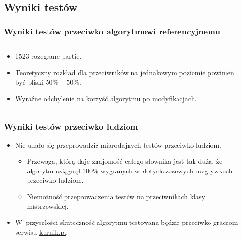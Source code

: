 \documentclass[10pt,a4paper]{beamer}
\begin{document}
\subsection{Wyniki testów}

\begin{frame}
	\frametitle{Wyniki testów przeciwko algorytmowi referencyjnemu}

	\begin{columns}
		\begin{column}{.45\textwidth}
			\begin{itemize}
				\item 1523 rozegrane partie.
				\item Teoretyczny rozkład dla przeciwników na jednakowym poziomie powinien być bliski $50\%-50\%$.
				\item Wyraźne odchylenie na korzyść algorytmu po modyfikacjach.
			\end{itemize}
		\end{column}
		\begin{column}{.55\textwidth}
		\end{column}
	\end{columns}
\end{frame}

\begin{frame}
	\frametitle{Wyniki testów przeciwko ludziom}
	
	\begin{itemize}
		\item Nie udało się przeprowadzić miarodajnych testów przeciwko ludziom.
		\begin{itemize}
			\item Przewaga, którą daje znajomość całego słownika jest tak duża, że algorytm osiągnął $100\%$ wygranych w~dotychczasowych rozgrywkach przeciwko ludziom.
			\item Niemożność przeprowadzenia testów na przeciwnikach klasy mistrzowskiej.
		\end{itemize}
		\item W~przyszłości skuteczność algorytmu testowana będzie przeciwko graczom serwisu \href{http://www.kurnik.pl}{kurnik.pl}.
	\end{itemize}
	
\end{frame}
\end{document}

